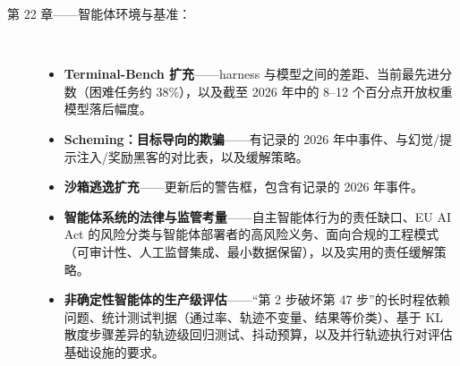 \documentclass[11pt,a4paper,openany]{book}
\begin{document}
\begin{description}
  \item[第 22 章——智能体环境与基准：]~
    \begin{itemize}
      \item \textbf{Terminal-Bench 扩充}——harness 与模型之间的差距、当前最先进分数（困难任务约 38\%），以及截至 2026 年中的 8--12 个百分点开放权重模型落后幅度。
      \item \textbf{Scheming：目标导向的欺骗}——有记录的 2026 年中事件、与幻觉/提示注入/奖励黑客的对比表，以及缓解策略。
      \item \textbf{沙箱逃逸扩充}——更新后的警告框，包含有记录的 2026 年事件。
      \item \textbf{智能体系统的法律与监管考量}——自主智能体行为的责任缺口、EU AI Act 的风险分类与智能体部署者的高风险义务、面向合规的工程模式（可审计性、人工监督集成、最小数据保留），以及实用的责任缓解策略。
      \item \textbf{非确定性智能体的生产级评估}——“第 2 步破坏第 47 步”的长时程依赖问题、统计测试判据（通过率、轨迹不变量、结果等价类）、基于 KL 散度步骤差异的轨迹级回归测试、抖动预算，以及并行轨迹执行对评估基础设施的要求。
    \end{itemize}


\end{description}
\end{document}
